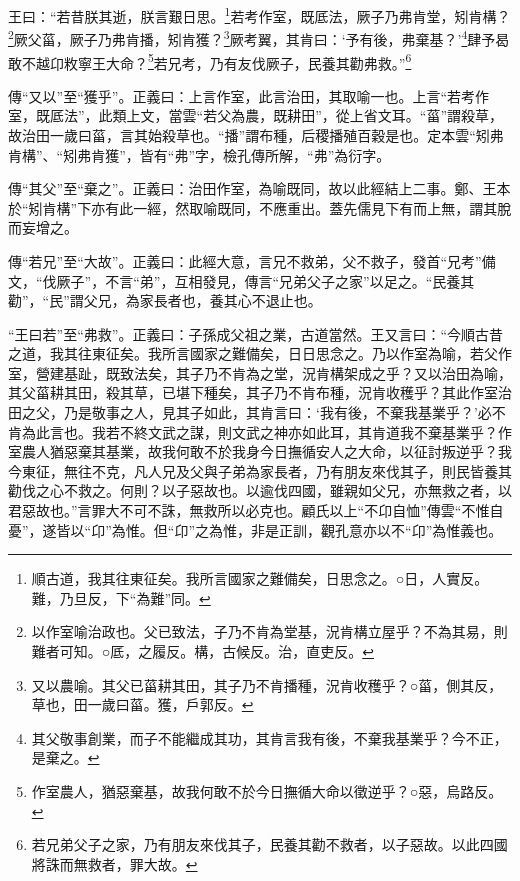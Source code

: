 王曰：“若昔朕其逝，朕言艱日思。\footnote{順古道，我其往東征矣。我所言國家之難備矣，日思念之。○日，人實反。難，乃旦反，下“為難”同。}若考作室，既厎法，厥子乃弗肯堂，矧肯構？\footnote{以作室喻治政也。父已致法，子乃不肯為堂基，況肯構立屋乎？不為其易，則難者可知。○厎，之履反。構，古候反。治，直吏反。}厥父菑，厥子乃弗肯播，矧肯獲？\footnote{又以農喻。其父已菑耕其田，其子乃不肯播種，況肯收穫乎？○菑，側其反，草也，田一歲曰菑。獲，戶郭反。}厥考翼，其肯曰：‘予有後，弗棄基？’\footnote{其父敬事創業，而子不能繼成其功，其肯言我有後，不棄我基業乎？今不正，是棄之。}肆予曷敢不越卬敉寧王大命？\footnote{作室農人，猶惡棄基，故我何敢不於今日撫循大命以徵逆乎？○惡，烏路反。}若兄考，乃有友伐厥子，民養其勸弗救。”\footnote{若兄弟父子之家，乃有朋友來伐其子，民養其勸不救者，以子惡故。以此四國將誅而無救者，罪大故。}


{\noindent\zhuan{}\fzbyks 傳“又以”至“獲乎”。正義曰：上言作室，此言治田，其取喻一也。上言“若考作室，既厎法”，此類上文，當雲“若父為農，既耕田”，從上省文耳。“菑”謂殺草，故治田一歲曰菑，言其始殺草也。“播”謂布種，后稷播殖百穀是也。定本雲“矧弗肯構”、“矧弗肯獲”，皆有“弗”字，檢孔傳所解，“弗”為衍字。 \par}

{\noindent\zhuan{}\fzbyks 傳“其父”至“棄之”。正義曰：治田作室，為喻既同，故以此經結上二事。鄭、王本於“矧肯構”下亦有此一經，然取喻既同，不應重出。蓋先儒見下有而上無，謂其脫而妄增之。 \par}

{\noindent\zhuan{}\fzbyks 傳“若兄”至“大故”。正義曰：此經大意，言兄不救弟，父不救子，發首“兄考”備文，“伐厥子”，不言“弟”，互相發見，傳言“兄弟父子之家”以足之。“民養其勸”，“民”謂父兄，為家長者也，養其心不退止也。 \par}

{\noindent\shu{}\fzkt “王曰若”至“弗救”。正義曰：子孫成父祖之業，古道當然。王又言曰：“今順古昔之道，我其往東征矣。我所言國家之難備矣，日日思念之。乃以作室為喻，若父作室，營建基趾，既致法矣，其子乃不肯為之堂，況肯構架成之乎？又以治田為喻，其父菑耕其田，殺其草，已堪下種矣，其子乃不肯布種，況肯收穫乎？其此作室治田之父，乃是敬事之人，見其子如此，其肯言曰：‘我有後，不棄我基業乎？’必不肯為此言也。我若不終文武之謀，則文武之神亦如此耳，其肯道我不棄基業乎？作室農人猶惡棄其基業，故我何敢不於我身今日撫循安人之大命，以征討叛逆乎？我今東征，無往不克，凡人兄及父與子弟為家長者，乃有朋友來伐其子，則民皆養其勸伐之心不救之。何則？以子惡故也。以逾伐四國，雖親如父兄，亦無救之者，以君惡故也。”言罪大不可不誅，無救所以必克也。顧氏以上“不卬自恤”傳雲“不惟自憂”，遂皆以“卬”為惟。但“卬”之為惟，非是正訓，觀孔意亦以不“卬”為惟義也。 \par}

